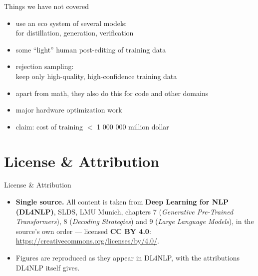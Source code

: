 \begin{frame}{Things we have not covered}

\vfill

\begin{itemize}
\item use an eco system of several models:\\
for distillation, generation, verification
\item some ``light'' human post-editing of training data
\item rejection sampling:\\ keep only high-quality,
    high-confidence training data
\item apart from math, they also do this for code and other domains
\item major hardware optimization work
\item claim: cost of training $<$ 1 000 000 million dollar
\end{itemize}

\vfill

\end{frame}



\section{License \& Attribution}

\begin{vbframe}{License \& Attribution}
\begin{itemize}
\item \textbf{Single source.} All content is taken from \textbf{Deep Learning for NLP (DL4NLP)}, SLDS, LMU Munich, chapters 7 (\textit{Generative Pre-Trained Transformers}), 8 (\textit{Decoding Strategies}) and 9 (\textit{Large Language Models}), in the source's own order --- licensed \textbf{CC BY 4.0}: \url{https://creativecommons.org/licenses/by/4.0/}.
\item Figures are reproduced as they appear in DL4NLP, with the attributions DL4NLP itself gives.
\end{itemize}
\end{vbframe}

\endlecture

